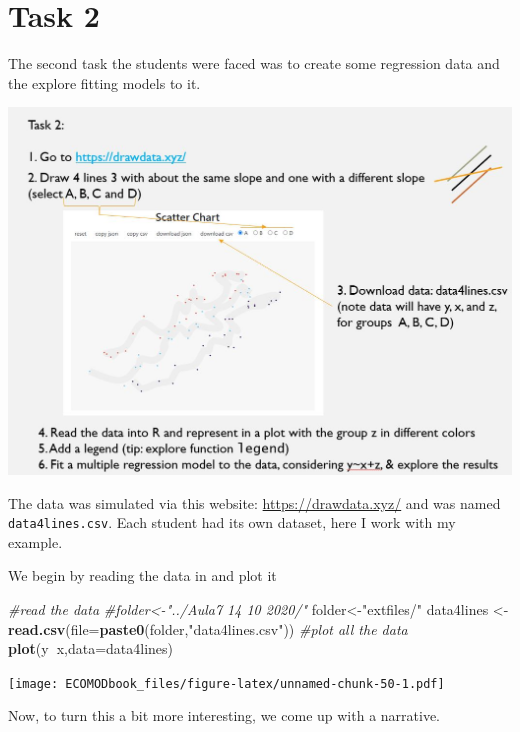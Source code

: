 \documentclass[
]{book}
\newenvironment{Shaded}{\begin{snugshade}}{\end{snugshade}}
\newcommand{\CommentTok}[1]{\textcolor[rgb]{0.56,0.35,0.01}{\textit{#1}}}
\newcommand{\DataTypeTok}[1]{\textcolor[rgb]{0.13,0.29,0.53}{#1}}
\newcommand{\KeywordTok}[1]{\textcolor[rgb]{0.13,0.29,0.53}{\textbf{#1}}}
\newcommand{\NormalTok}[1]{#1}
\newcommand{\OperatorTok}[1]{\textcolor[rgb]{0.81,0.36,0.00}{\textbf{#1}}}
\newcommand{\StringTok}[1]{\textcolor[rgb]{0.31,0.60,0.02}{#1}}
\begin{document}
\hypertarget{task-2}{%
\section{Task 2}\label{task-2}}

The second task the students were faced was to create some regression data and the explore fitting models to it.

\includegraphics{extfiles/Aula7Task7.JPG}

The data was simulated via this website: \url{https://drawdata.xyz/} and was named \texttt{data4lines.csv}. Each student had its own dataset, here I work with my example.

We begin by reading the data in and plot it

\begin{Shaded}
\begin{Highlighting}[]
\CommentTok{#read the data}
\CommentTok{#folder<-"../Aula7 14 10 2020/"}
\NormalTok{folder<-}\StringTok{"extfiles/"}
\NormalTok{data4lines <-}\StringTok{ }\KeywordTok{read.csv}\NormalTok{(}\DataTypeTok{file=}\KeywordTok{paste0}\NormalTok{(folder,}\StringTok{"data4lines.csv"}\NormalTok{))}
\CommentTok{#plot all the data}
\KeywordTok{plot}\NormalTok{(y}\OperatorTok{~}\NormalTok{x,}\DataTypeTok{data=}\NormalTok{data4lines)}
\end{Highlighting}
\end{Shaded}

\texttt{[image: ECOMODbook\_files/figure-latex/unnamed-chunk-50-1.pdf]}

Now, to turn this a bit more interesting, we come up with a narrative.
\end{document}
